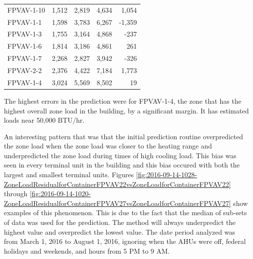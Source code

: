 \begin{table}[]
\begin{tabular}{lrrrr}
FPVAV-1-10 & 1,512 & 2,819 & 4,634  & 1,054  \\
FPVAV-1-1  & 1,598 & 3,783 & 6,267  & -1,359 \\
FPVAV-1-3  & 1,755 & 3,164 & 4,868  & -237   \\
FPVAV-1-6  & 1,814 & 3,186 & 4,861  & 261    \\
FPVAV-1-7  & 2,268 & 2,827 & 3,942  & -326   \\
FPVAV-2-2  & 2,376 & 4,422 & 7,184  & 1,773  \\
FPVAV-1-4  & 3,024 & 5,569 & 8,502  & 19     \\
    \bottomrule
\end{tabular}
\end{table}

The highest errors in the prediction were for FPVAV-1-4, the zone that
has the highest overall zone load in the building, by a significant
margin. It has estimated loads near 50,000 BTU/hr.



An interesting pattern that was that the initial prediction routine
overpredicted the zone load when the zone load was closer to the heating
range and underpredicted the zone load during times of high cooling
load. This bias was seen in every terminal unit in the building and this
bias occured with both the largest and smallest terminal units. Figures
\ref{fig:2016-09-14-1028-ZoneLoadResidualforContainerFPVAV22vsZoneLoadforContainerFPVAV22}
through
\ref{fig:2016-09-14-1020-ZoneLoadResidualforContainerFPVAV27vsZoneLoadforContainerFPVAV27}
show examples of this phenomenon. This is due to the fact that the
median of sub-sets of data was used for the prediction. The method will
always underpredict the highest value and overpredict the lowest value.
The date period analyzed was from March 1, 2016 to August 1, 2016,
ignoring when the AHUs were off, federal holidays and weekends, and
hours from 5 PM to 9 AM. 

\newcommand{\zoneLoadCaption}[1]{Bias in zone load prediction for #1.}

